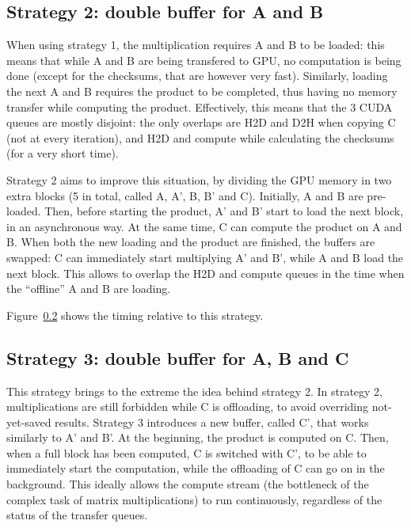 
\subsection{Strategy 2: double buffer for A and B}

When using strategy 1, the multiplication requires A and B to be loaded: this means that while A and B are being transfered to GPU, no computation is being done (except for the checksums, that are however very fast).
Similarly, loading the next A and B requires the product to be completed, thus having no memory transfer while computing the product.
Effectively, this means that the 3 CUDA queues are mostly disjoint: the only overlaps are H2D and D2H when copying C (not at every iteration), and H2D and compute while calculating the checksums (for a very short time).

Strategy 2 aims to improve this situation, by dividing the GPU memory in two extra blocks (5 in total, called A, A', B, B' and C).
Initially, A and B are pre-loaded.
Then, before starting the product, A' and B' start to load the next block, in an asynchronous way.
At the same time, C can compute the product on A and B.
When both the new loading and the product are finished, the buffers are swapped: C can immediately start multiplying A' and B', while A and B load the next block.
This allows to overlap the H2D and compute queues in the time when the ``offline'' A and B are loading.

Figure~\ref{} shows the timing relative to this strategy.


\subsection{Strategy 3: double buffer for A, B and C}

This strategy brings to the extreme the idea behind strategy 2.
In strategy 2, multiplications are still forbidden while C is offloading, to avoid overriding not-yet-saved results.
Strategy 3 introduces a new buffer, called C', that works similarly to A' and B'.
At the beginning, the product is computed on C.
Then, when a full block has been computed, C is switched with C', to be able to immediately start the computation, while the offloading of C can go on in the background.
This ideally allows the compute stream (the bottleneck of the complex task of matrix multiplications) to run continuously, regardless of the status of the transfer queues.

